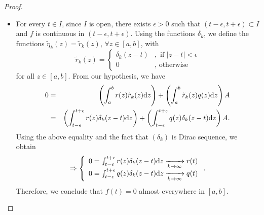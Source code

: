 \documentclass[12pt,a4paper]{article}
\begin{document}
\begin{proof}
\begin{itemize}
\item[(ii)] 
For every $t \in I$, since $I$ is open, there exists $\epsilon > 0$ such that $(t-\epsilon, t+\epsilon) \subset I$ and $f$ is continuous in $(t-\epsilon, t+\epsilon)$. 
Using the functions $\delta_k$, we define the functions $\tilde{\eta}_k(z) = \tilde{r}_k(z)$, $\forall z \in [a,b]$, with 
$$
\tilde{r}_k(z) = \left\lbrace\begin{array}{cl}
\delta_k(z-t)    &, \mbox{ if } |z-t|< \epsilon \\
0     &, \mbox{ otherwise}  
\end{array}\right.$$
for all $z \in [a,b].$
From our hypothesis, we have
\begin{eqnarray*}
0 & = & \left(\int_{a}^{b} r(z)\tilde{r}_k(z) \textnormal{d}z\right) +     
\left(\int_{a}^{b} \tilde{r}_k(z)q(z)\textnormal{d}z\right)A \\
& = & \left(\int_{t-\epsilon}^{t+\epsilon} r(z)\delta_k(z-t) \textnormal{d}z\right) +     
\left(\int_{t-\epsilon}^{t+\epsilon} q(z)\delta_k(z-t)\textnormal{d}z\right)A.
\end{eqnarray*}
Using the above equality and the fact that $(\delta_k)$ is Dirac sequence, we obtain 
$$\Rightarrow \left\lbrace \begin{array}{l}
0 = \int_{t-\epsilon}^{t+\epsilon} r(z)\delta_k(z-t) \textnormal{d}z \xrightarrow[k\to \infty]{} r(t)     \\ 
0 = \int_{t-\epsilon}^{t+\epsilon} q(z)\delta_k(z-t) \textnormal{d}z \xrightarrow[k\to \infty]{} q(t)
\end{array}\right..
$$
Therefore, we conclude that $f(t) = 0$ almost everywhere in $[a,b].$
\end{itemize}
\end{proof}
\end{document}
